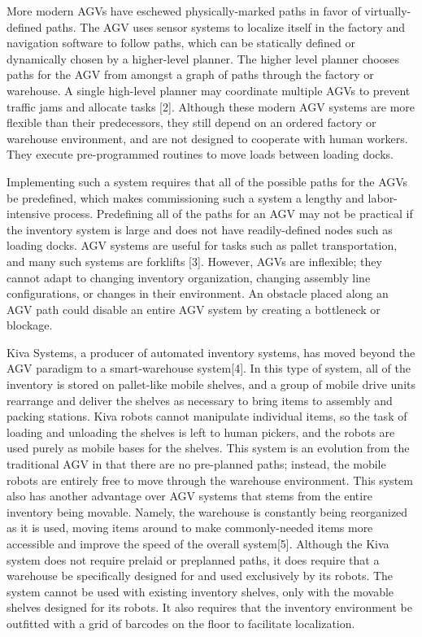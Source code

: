 \documentclass[]{cwru} %
\begin{document}
More modern AGVs have eschewed physically-marked paths in favor of
virtually-defined paths. The AGV uses sensor systems to localize itself
in the factory and navigation software to follow paths, which can be
statically defined or dynamically chosen by a higher-level planner. The
higher level planner chooses paths for the AGV from amongst a graph of
paths through the factory or warehouse. A single high-level planner may
coordinate multiple AGVs to prevent traffic jams and allocate tasks
{[}2{]}. Although these modern AGV systems are more flexible than their
predecessors, they still depend on an ordered factory or warehouse
environment, and are not designed to cooperate with human workers. They
execute pre-programmed routines to move loads between loading docks.

Implementing such a system requires that all of the possible paths for
the AGVs be predefined, which makes commissioning such a system a
lengthy and labor-intensive process. Predefining all of the paths for an
AGV may not be practical if the inventory system is large and does not
have readily-defined nodes such as loading docks. AGV systems are useful
for tasks such as pallet transportation, and many such systems are
forklifts {[}3{]}. However, AGVs are inflexible; they cannot adapt to
changing inventory organization, changing assembly line configurations,
or changes in their environment. An obstacle placed along an AGV path
could disable an entire AGV system by creating a bottleneck or blockage.

Kiva Systems, a producer of automated inventory systems, has moved
beyond the AGV paradigm to a smart-warehouse system{[}4{]}. In this type
of system, all of the inventory is stored on pallet-like mobile shelves,
and a group of mobile drive units rearrange and deliver the shelves as
necessary to bring items to assembly and packing stations. Kiva robots
cannot manipulate individual items, so the task of loading and unloading
the shelves is left to human pickers, and the robots are used purely as
mobile bases for the shelves. This system is an evolution from the
traditional AGV in that there are no pre-planned paths; instead, the
mobile robots are entirely free to move through the warehouse
environment. This system also has another advantage over AGV systems
that stems from the entire inventory being movable. Namely, the
warehouse is constantly being reorganized as it is used, moving items
around to make commonly-needed items more accessible and improve the
speed of the overall system{[}5{]}. Although the Kiva system does not
require prelaid or preplanned paths, it does require that a warehouse be
specifically designed for and used exclusively by its robots. The system
cannot be used with existing inventory shelves, only with the movable
shelves designed for its robots. It also requires that the inventory
environment be outfitted with a grid of barcodes on the floor to
facilitate localization.
\end{document}
